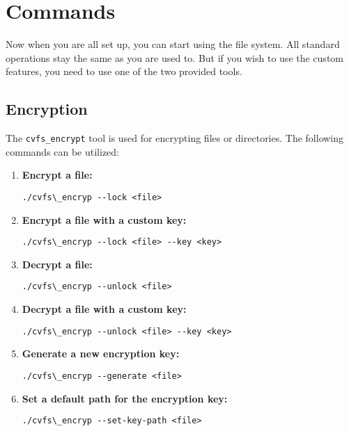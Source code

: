 \section*{Commands}

Now when you are all set up, you can start using the file system.
All standard operations stay the same as you are used to.
But if you wish to use the custom features, you need to use one of the two provided tools.

\subsection*{Encryption}

The \texttt{cvfs\_encrypt} tool is used for encrypting files or directories.
The following commands can be utilized:

\begin{enumerate}
    \setlength\itemsep{-0.1em}
    \item \textbf{Encrypt a file:} \\
    \begin{BVerbatim}[baseline=t,boxwidth=10cm]
  ./cvfs\_encryp --lock <file>
    \end{BVerbatim}

    \item \textbf{Encrypt a file with a custom key:} \\
    \begin{BVerbatim}[baseline=t,boxwidth=10cm]
  ./cvfs\_encryp --lock <file> --key <key>
    \end{BVerbatim}

    \item \textbf{Decrypt a file:} \\
    \begin{BVerbatim}[baseline=t,boxwidth=10cm]
  ./cvfs\_encryp --unlock <file>
    \end{BVerbatim}

    \item \textbf{Decrypt a file with a custom key:} \\
    \begin{BVerbatim}[baseline=t,boxwidth=10cm]
  ./cvfs\_encryp --unlock <file> --key <key>
    \end{BVerbatim}

    \item \textbf{Generate a new encryption key:} \\
    \begin{BVerbatim}[baseline=t,boxwidth=10cm]
  ./cvfs\_encryp --generate <file>
    \end{BVerbatim}

    \item \textbf{Set a default path for the encryption key:} \\
    \begin{BVerbatim}[baseline=t,boxwidth=10cm]
  ./cvfs\_encryp --set-key-path <file>
    \end{BVerbatim}
\end{enumerate}

